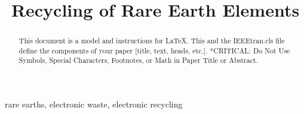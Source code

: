 \documentclass[conference]{IEEEtran}
\begin{document}
\title{Recycling of Rare Earth Elements}

\author{
}

\maketitle

\begin{abstract}
This document is a model and instructions for \LaTeX.
This and the IEEEtran.cls file define the components of your paper [title, text, heads, etc.]. *CRITICAL: Do Not Use Symbols, Special Characters, Footnotes, 
or Math in Paper Title or Abstract.
\end{abstract}

\begin{IEEEkeywords}
rare earths, electronic waste, electronic recycling
\end{IEEEkeywords}














\end{document}
